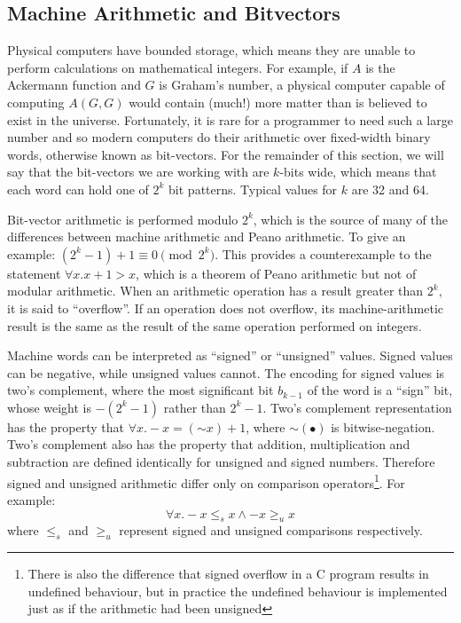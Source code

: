\documentclass[preprint]{sigplanconf}
\theoremstyle{definition}
\begin{document}
\subsection{Machine Arithmetic and Bitvectors} \label{sec:machine.arith} 
Physical computers have bounded storage, which means they are unable to perform calculations on mathematical
integers.  For example, if $A$ is the Ackermann function and $G$ is Graham's number, a physical computer
capable of computing $A(G, G)$ would contain (much!) more matter than is believed to exist in the universe.
Fortunately, it is rare for a programmer to need such a large number and so modern computers do their arithmetic
over fixed-width binary words, otherwise known as bit-vectors.  For the remainder of this section, we will say that
the bit-vectors we are working with are $k$-bits wide, which means that each word can hold one of $2^k$ bit patterns.
Typical values for $k$ are 32 and 64.

Bit-vector arithmetic is performed modulo $2^k$, which is the source of many of the differences between
machine arithmetic and Peano arithmetic.  To give an example: $(2^k - 1) + 1 \equiv 0 \pmod {2^k}$.
This provides a counterexample to the statement $\forall x . x + 1 > x$, which is a theorem of Peano
arithmetic but not of modular arithmetic.  When an arithmetic operation has a result greater than $2^k$,
it is said to ``overflow''.  If an operation does not overflow, its machine-arithmetic result is the same
as the result of the same operation performed on integers.

Machine words can be interpreted as ``signed'' or ``unsigned'' values.  Signed values can be negative,
while unsigned values cannot.  The encoding for signed values is two's complement, where the most significant
bit $b_{k-1}$ of the word is a ``sign'' bit, whose weight is $-(2^k - 1)$ rather than $2^k - 1$.  Two's complement
representation has the property that $\forall x . -x = (\mathord{\sim} x) + 1$, where $\mathord{\sim}(\bullet)$
is bitwise-negation.  Two's complement also has the property that addition, multiplication and subtraction are defined
identically for unsigned and signed numbers.  Therefore signed and unsigned arithmetic differ only on comparison
operators\footnote{There is also the difference that signed overflow in a C program results in undefined behaviour,
but in practice the undefined behaviour is implemented just as if the arithmetic had been unsigned}.
For example: $$\forall x . -x \leq_s x \wedge -x \geq_u x$$ where $\leq_s$ and $\geq_u$ represent signed and unsigned comparisons respectively.
\end{document}
